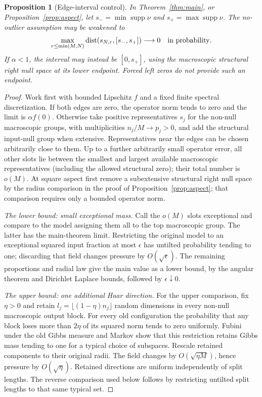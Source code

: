 \documentclass[11pt]{article}
\numberwithin{equation}{section}
\newtheorem{proposition}[theorem]{Proposition}
\theoremstyle{definition}
\newcommand{\supp}{\operatorname{supp}}
\begin{document}
\begin{proposition}[Edge-interval control]\label{prop:edges}
In Theorem~\ref{thm:main}, or Proposition~\ref{prop:aspect}, let $s_-=\min\supp\nu$ and $s_+=\max\supp\nu$. The no-outlier assumption may be weakened to
\begin{equation}\label{eq:edges}
\max_{r\le\min(M,N)}\operatorname{dist}(s_{N,r},[s_-,s_+])\longrightarrow0
\quad\hbox{in probability}.
\end{equation}
If $\alpha<1$, the interval may instead be $[0,s_+]$, using the macroscopic structural right null space at its lower endpoint. Forced left zeros do not provide such an endpoint.
\end{proposition}
\begin{proof}
Work first with bounded Lipschitz $f$ and a fixed finite spectral discretization. If both edges are zero, the operator norm tends to zero and the limit is $\alpha f(0)$. Otherwise take positive representatives $s_j$ for the non-null macroscopic groups, with multiplicities $n_j/M\to p_j>0$, and add the structural input-null group when extensive. Representatives near the edges can be chosen arbitrarily close to them. Up to a further arbitrarily small operator error, all other slots lie between the smallest and largest available macroscopic representatives (including the allowed structural zero); their total number is $o(M)$. At square aspect first remove a subextensive structural right null space by the radius comparison in the proof of Proposition~\ref{prop:aspect}; that comparison requires only a bounded operator norm.

\smallskip
\noindent\emph{The lower bound: small exceptional mass.}
Call the $o(M)$ slots exceptional and compare to the model assigning them all to the top macroscopic group. The latter has the main-theorem limit. Restricting the original model to an exceptional squared input fraction at most $\epsilon$ has untilted probability tending to one; discarding that field changes pressure by $O(\sqrt\epsilon)$. The remaining proportions and radial law give the main value as a lower bound, by the angular theorem and Dirichlet Laplace bounds, followed by $\epsilon\downarrow0$.

\smallskip
\noindent\emph{The upper bound: one additional Haar direction.}
For the upper comparison, fix $\eta>0$ and retain $l_j=\lfloor(1-\eta)n_j\rfloor$ random dimensions in every non-null macroscopic output block. For every old configuration the probability that any block loses more than $2\eta$ of its squared norm tends to zero uniformly. Fubini under the old Gibbs measure and Markov show that this restriction retains Gibbs mass tending to one for a typical choice of subspaces. Rescale retained components to their original radii. The field changes by $O(\sqrt{\eta M})$, hence pressure by $O(\sqrt\eta)$. Retained directions are uniform independently of split lengths. The reverse comparison used below follows by restricting untilted split lengths to that same typical set.


\end{proof}
\end{document}
